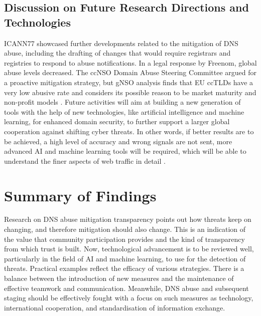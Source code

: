 \subsection{Discussion on Future Research Directions and Technologies}


ICANN77 showcased further developments related to the mitigation of DNS abuse, including the drafting of changes that would require registrars and registries to respond to abuse notifications. In a legal response by Freenom, global abuse levels decreased. The ccNSO Domain Abuse Steering Committee argued for a proactive mitigation strategy, but gNSO analysis finds that EU ccTLDs have a very low abusive rate and considers its possible reason to be market maturity and non-profit models \cite{VanRoste2023}. Future activities will aim at building a new generation of tools with the help of new technologies, like artificial intelligence and machine learning, for enhanced domain security, to further support a larger global cooperation against shifting cyber threats. In other words, if better results are to be achieved, a high level of accuracy and wrong signals are not sent, more advanced AI and machine learning tools will be required, which will be able to understand the finer aspects of web traffic in detail \cite{ISG2023}.

\section{Summary of Findings}

Research on DNS abuse mitigation transparency points out how threats keep on changing, and therefore mitigation should also change. This is an indication of the value that community participation provides and the kind of transparency from which trust is built. Now, technological advancement is to be reviewed well, particularly in the field of AI and machine learning, to use for the detection of threats. Practical examples reflect the efficacy of various strategies. There is a balance between the introduction of new measures and the maintenance of effective teamwork and communication. Meanwhile, DNS abuse and subsequent staging should be effectively fought with a focus on such measures as technology, international cooperation, and standardisation of information exchange.





















